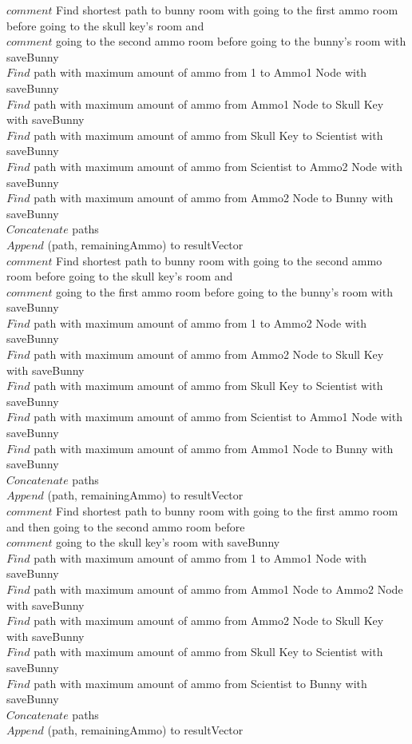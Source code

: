 \documentclass[10pt]{article}
\begin{document}
		$comment$  Find shortest path to bunny room with going to the first ammo room before going to the skull key's room and  \\
		$comment$ going to the second ammo room before going to the bunny's room with saveBunny \\
		 $Find$ path with maximum amount of ammo from 1 to Ammo1 Node with saveBunny  \\
		 $Find$ path with maximum amount of ammo from Ammo1 Node to Skull Key with saveBunny \\
		 $Find$ path with maximum amount of ammo from Skull Key to Scientist with saveBunny \\
		 $Find$ path with maximum amount of ammo from Scientist to Ammo2 Node with saveBunny \\
		 $Find$ path with maximum amount of ammo from Ammo2 Node to Bunny with saveBunny \\
		$Concatenate$ paths  \\
		$Append$ (path, remainingAmmo) to resultVector \\

		$comment$  Find shortest path to bunny room with going to the second ammo room before going to the skull key's room and  \\
		$comment$ going to the first ammo room before going to the bunny's room with saveBunny \\
		 $Find$ path with maximum amount of ammo from 1 to Ammo2 Node with saveBunny  \\
		 $Find$ path with maximum amount of ammo from Ammo2 Node to Skull Key with saveBunny \\
		 $Find$ path with maximum amount of ammo from Skull Key to Scientist with saveBunny \\
		 $Find$ path with maximum amount of ammo from Scientist to Ammo1 Node with saveBunny \\
		 $Find$ path with maximum amount of ammo from Ammo1 Node to Bunny with saveBunny \\
		$Concatenate$ paths  \\
		$Append$ (path, remainingAmmo) to resultVector \\

		$comment$  Find shortest path to bunny room with going to the first ammo room and then going to the second ammo room before  \\
		$comment$ going to the skull key's room with saveBunny \\
		 $Find$ path with maximum amount of ammo from 1 to Ammo1 Node with saveBunny  \\
		 $Find$ path with maximum amount of ammo from Ammo1 Node to Ammo2 Node with saveBunny \\
		 $Find$ path with maximum amount of ammo from Ammo2 Node to Skull Key with saveBunny \\
		 $Find$ path with maximum amount of ammo from Skull Key to Scientist with saveBunny \\
		 $Find$ path with maximum amount of ammo from Scientist to Bunny with saveBunny \\
		$Concatenate$ paths  \\
		$Append$ (path, remainingAmmo) to resultVector \\
\end{document}
